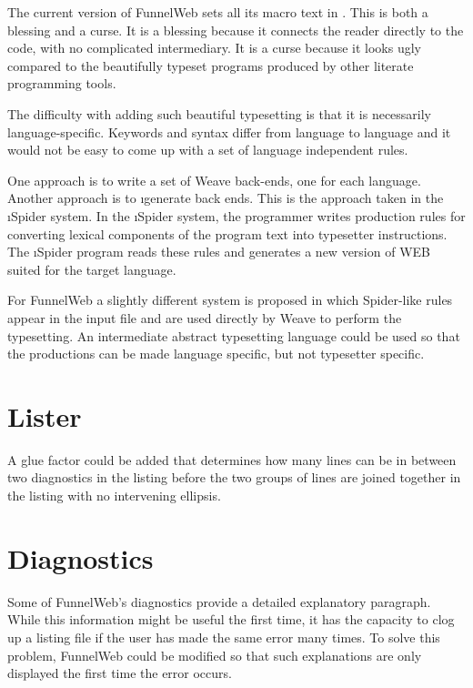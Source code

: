  The current version of FunnelWeb sets all its
macro text in . This is both a blessing and a curse. It is a
blessing because it connects the reader directly to the code, with no
complicated intermediary. It is a curse because it looks ugly compared to
the beautifully typeset programs produced by other literate programming
tools.

The difficulty with adding such beautiful typesetting is that it is
necessarily language-specific. Keywords and syntax differ from language
to language and it would not be easy to come up with a set of language
independent rules.

One approach is to write a set of Weave back-ends, one for each language.
Another approach is to \i{generate} back ends. This is the approach
taken in the \i{Spider} system.
In the \i{Spider} system,
the programmer writes production rules for converting lexical components
of the program text into typesetter instructions. The \i{Spider} program
reads these rules and generates a new version of WEB suited for the target
language.

For FunnelWeb a slightly different system is proposed in which Spider-like
rules appear in the input file and are used directly by Weave to perform the
typesetting. An intermediate abstract typesetting language could be used
so that the productions can be made language specific, but not typesetter
specific.

\section{Lister}

 A glue factor could be added that determines how many
lines can be in between two diagnostics in the listing before the two
groups of lines are joined together in the listing with no intervening
ellipsis.

\section{Diagnostics}

 Some of FunnelWeb's diagnostics provide
a detailed explanatory paragraph. While this information might be useful the
first time, it has the capacity to clog up a listing file if the user has
made the same error many times. To solve this problem, FunnelWeb could be
modified so that such explanations are only displayed the first time the
error occurs.

